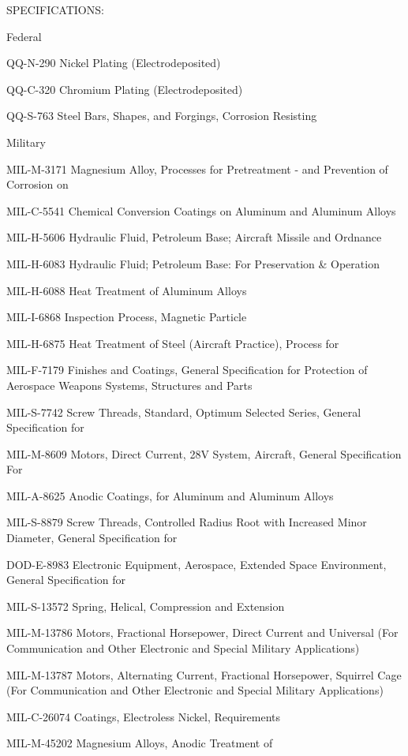 \documentclass[12pt]{article}
\begin{document}
SPECIFICATIONS:

Federal

QQ-N-290 Nickel Plating (Electrodeposited)

QQ-C-320 Chromium Plating (Electrodeposited)

QQ-S-763 Steel Bars, Shapes, and Forgings, Corrosion Resisting

Military

MIL-M-3171 Magnesium Alloy, Processes for Pretreatment - and Prevention of Corrosion on

MIL-C-5541 Chemical Conversion Coatings on Aluminum and Aluminum Alloys

MIL-H-5606 Hydraulic Fluid, Petroleum Base; Aircraft Missile and Ordnance

MIL-H-6083 Hydraulic Fluid; Petroleum Base: For Preservation \& Operation

MIL-H-6088 Heat Treatment of Aluminum Alloys

MIL-I-6868 Inspection Process, Magnetic Particle

MIL-H-6875 Heat Treatment of Steel (Aircraft Practice), Process for

MIL-F-7179 Finishes and Coatings, General Specification for Protection of Aerospace Weapons Systems, Structures and Parts

MIL-S-7742 Screw Threads, Standard, Optimum Selected Series, General Specification for

MIL-M-8609 Motors, Direct Current, 28V System, Aircraft, General Specification For

MIL-A-8625 Anodic Coatings, for Aluminum and Aluminum Alloys

MIL-S-8879 Screw Threads, Controlled Radius Root with Increased Minor Diameter, General Specification for

DOD-E-8983 Electronic Equipment, Aerospace, Extended Space Environment, General Specification for

MIL-S-13572 Spring, Helical, Compression and Extension

MIL-M-13786 Motors, Fractional Horsepower, Direct Current and Universal (For Communication and Other Electronic and Special Military Applications)

MIL-M-13787 Motors, Alternating Current, Fractional Horsepower, Squirrel Cage (For Communication and Other Electronic and Special Military Applications)

MIL-C-26074 Coatings, Electroless Nickel, Requirements

MIL-M-45202 Magnesium Alloys, Anodic Treatment of
\end{document}

